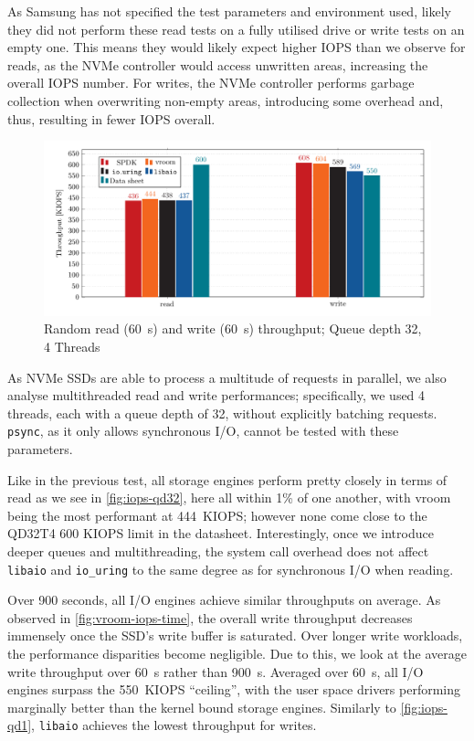 As Samsung has not specified the test parameters and environment used, likely they did not perform these read tests on a fully utilised drive or write tests on an empty one. This means they would likely expect higher IOPS than we observe for reads, as the NVMe controller would access unwritten areas, increasing the overall IOPS number. For writes, the NVMe controller performs garbage collection when overwriting non-empty areas, introducing some overhead and, thus, resulting in fewer IOPS overall.


\begin{figure}
  \centering
    \includegraphics[width=\textwidth]{figures/iops-qd32-ybar}
    \caption{Random read (\qty{60}{\second}) and write (\qty{60}{\second}) throughput; Queue depth 32, 4 Threads}
    \label{fig:iops-qd32}
\end{figure}

As NVMe SSDs are able to process a multitude of requests in parallel, we also analyse multithreaded read and write performances; specifically, we used 4 threads, each with a queue depth of 32, without explicitly batching requests. \texttt{psync}, as it only allows synchronous I/O, cannot be tested with these parameters.

Like in the previous test, all storage engines perform pretty closely in terms of read as we see in \autoref{fig:iops-qd32}, here all within 1\% of one another, with vroom being the most performant at \qty{444}{KIOPS}; however none come close to the QD32T4 600 KIOPS limit in the datasheet. Interestingly, once we introduce deeper queues and multithreading, the system call overhead does not affect \texttt{libaio} and \texttt{io\_uring} to the same degree as for synchronous I/O when reading.

Over 900 seconds, all I/O engines achieve similar throughputs on average. As observed in \autoref{fig:vroom-iops-time}, the overall write throughput decreases immensely once the SSD's write buffer is saturated. Over longer write workloads, the performance disparities become negligible. Due to this, we look at the average write throughput over \qty{60}{\second} rather than \qty{900}{\second}. Averaged over \qty{60}{\second}, all I/O engines surpass the \qty{550}{KIOPS} ``ceiling'', with the user space drivers performing marginally better than the kernel bound storage engines. Similarly to \autoref{fig:iops-qd1}, \texttt{libaio} achieves the lowest throughput for writes.

